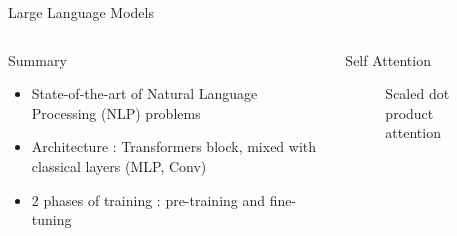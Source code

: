 \begin{frame}{Large Language Models}
\begin{columns}
      
    \begin{column}[t]{0.4\textwidth}
    \begin{block}{Summary}
    
        \begin{itemize}
            \item State-of-the-art of Natural Language Processing (NLP) problems
            \item Architecture : Transformers\cite{NIPS2017_3f5ee243} block, mixed with classical layers (MLP, Conv)
            \item 2 phases of training : pre-training and fine-tuning
        \end{itemize}
            

    \end{block}
    \end{column}
        
    \begin{column}[t]{0.6\textwidth}
    \begin{block}{Self Attention }

        \begin{figure}
            \centering
            
            \caption{Scaled dot product attention}
            \hfill
        \end{figure}
    

    \end{block}
    \end{column}
         
\end{columns}
\end{frame}


